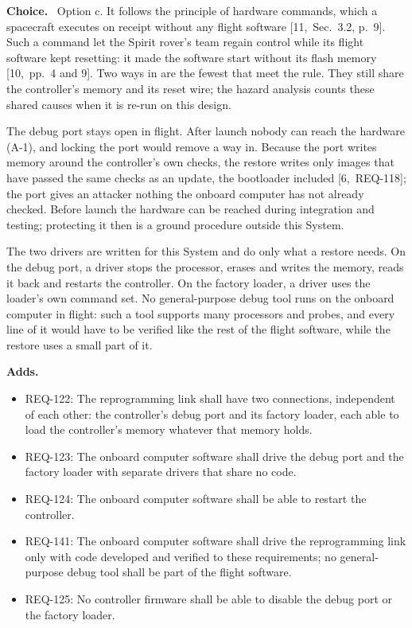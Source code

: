 \documentclass[11pt,a4paper]{article}
\newcommand{\field}[1]{\par\needspace{4\baselineskip}\smallskip\noindent\textbf{#1.}~}
\begin{document}
\field{Choice} Option c. It follows the principle of hardware
commands, which a spacecraft executes on receipt without any flight software
[11,~Sec.~3.2, p.~9]. Such a command let the Spirit rover's team regain control
while its flight software kept resetting: it made the software start without
its flash memory [10,~pp.~4 and 9]. Two ways in are the fewest that meet the
rule. They still share the controller's memory and its reset wire; the hazard
analysis counts these shared causes when it is re-run on this design.

The debug port stays open in flight. After launch nobody can reach the hardware
(A-1), and locking the port would remove a way in. Because the port writes
memory around the controller's own checks, the restore writes only images that
have passed the same checks as an update, the bootloader included
[6,~REQ-118]; the port gives an attacker nothing the onboard computer has not
already checked. Before launch the hardware can be reached during integration
and testing; protecting it then is a ground procedure outside this System.

The two drivers are written for this System and do only what a restore needs.
On the debug port, a driver stops the processor, erases and writes the memory,
reads it back and restarts the controller. On the factory loader, a driver uses
the loader's own command set. No general-purpose debug tool runs on the
onboard computer in flight: such a tool supports many processors and probes,
and every line of it would have to be verified like the rest of the flight
software, while the restore uses a small part of it.

\field{Adds}
\begin{itemize}
\item REQ-122: The reprogramming link shall have two connections, independent of each other: the controller's debug port and its factory loader, each able to load the controller's memory whatever that memory holds.
\item REQ-123: The onboard computer software shall drive the debug port and the factory loader with separate drivers that share no code.
\item REQ-124: The onboard computer software shall be able to restart the controller.
\item REQ-141: The onboard computer software shall drive the reprogramming link only with code developed and verified to these requirements; no general-purpose debug tool shall be part of the flight software.
\item REQ-125: No controller firmware shall be able to disable the debug port or the factory loader.
\end{itemize}
\end{document}
